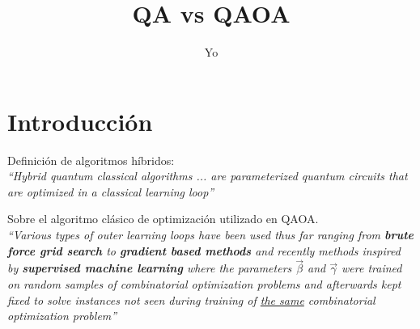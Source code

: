 \documentclass{article}
\title{QA vs QAOA}
\author{Yo}
\begin{document}
\maketitle{}

\section{Introducción}
\label{sec:introduccion}

Definición de algoritmos híbridos: \\
\textit{``Hybrid quantum classical algorithms ... are parameterized quantum circuits that are optimized in a classical learning loop''} \\

\par
Sobre el algoritmo clásico de optimización utilizado en QAOA. \\
\textit{``Various types of outer learning loops have been used thus far ranging from \textbf{brute force grid search} to \textbf{gradient based methods} and recently methods inspired by \textbf{supervised machine learning} where the parameters \(\vec{\beta}\) and \(\vec{\gamma}\) were trained on random samples of combinatorial optimization problems and afterwards kept fixed to solve instances not seen during training of \underline{the same} combinatorial optimization problem''}
\end{document}
